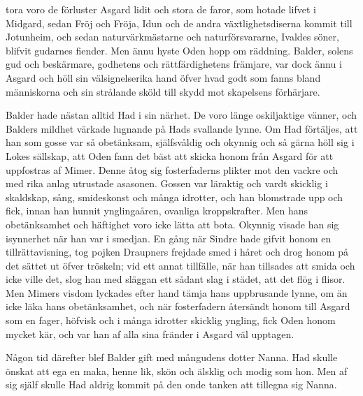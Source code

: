 \endSecII


\dropcapS tora voro de förluster Asgard lidit och stora de faror, som hotade
lifvet i Midgard, sedan Fröj och Fröja, Idun och de andra
växtlighetsdiserna kommit till Jotunheim, och sedan naturvärkmästarne
och naturförsvararne, Ivaldes söner, blifvit gudarnes fiender. Men ännu
hyste Oden hopp om räddning. Balder, solens gud och beskärmare,
godhetens och rättfärdighetens främjare, var dock ännu i Asgard och höll
sin välsignelserika hand öfver hvad godt som fanns bland människorna och
sin strålande sköld till skydd mot skapelsens förhärjare.

Balder hade nästan alltid Had i sin närhet. De voro länge oskiljaktige
vänner, och Balders mildhet värkade lugnande på Hads svallande lynne. Om
Had förtäljes, att han som gosse var så obetänksam, själfsvåldig och
okynnig och så gärna höll sig i Lokes sällskap, att Oden fann det bäst
att skicka honom från Asgard för att uppfostras af Mimer. Denne åtog sig
fosterfaderns plikter mot den vackre och med rika anlag utrustade
asasonen. Gossen var läraktig och vardt skicklig i skaldskap, sång,
smideskonst och många idrotter, och han blomstrade upp och fick, innan
han hunnit ynglingaåren, ovanliga kroppskrafter. Men hans obetänksamhet
och häftighet voro icke lätta att bota. Okynnig visade han sig
isynnerhet när han var i smedjan. En gång när Sindre hade gifvit honom
en tillrättavisning, tog pojken Draupners frejdade smed i håret och drog
honom på det sättet ut öfver tröskeln; vid ett annat tillfälle, när han
tillsades att smida och icke ville det, slog han med släggan ett sådant
slag i städet, att det flög i flisor. Men Mimers visdom lyckades
efter hand tämja hans uppbrusande lynne, om än icke läka hans
obetänksamhet, och när fosterfadern återsändt honom till Asgard som en
fager, höfvisk och i många idrotter skicklig yngling, fick Oden honom
mycket kär, och var han af alla sina fränder i Asgard väl upptagen.

Någon tid därefter blef Balder gift med mångudens dotter Nanna. Had
skulle önskat att ega en maka, henne lik, skön och älsklig och modig som
hon. Men af sig själf skulle Had aldrig kommit på den onde tanken att
tillegna sig Nanna.

